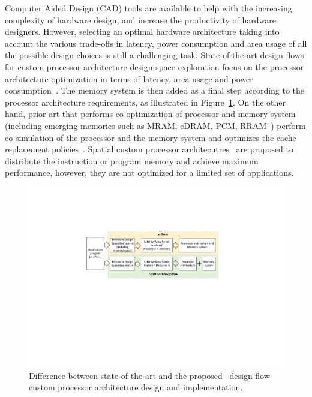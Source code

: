 Computer Aided Design (CAD) tools are available to help with the increasing complexity of hardware design, and increase the productivity of hardware designers. However, selecting an optimal hardware architecture taking into account the various trade-offs in latency, power consumption and area usage of all the possible design choices is still a challenging task. State-of-the-art design flows for custom processor architecture design-space exploration focus on the processor architecture optimization in terms of latency, area usage and power consumption~\cite{Meloni2012,Jordans2014,EusseSAMOS2014,Jozwiak2013,Karuri2009}. The memory system is then added as a final step according to the processor architecture requirements, as illustrated in Figure~\ref{fig:intro}. On the other hand, prior-art that performs co-optimization of processor and memory system (including emerging memories such as MRAM, eDRAM, PCM, RRAM~\cite{mem2016}) perform co-simulation of the processor and the memory system and optimizes the cache replacement policies~\cite{4798259,7092595,6271803,7360193,200116,Patel2016ReducingSL,Komalan:2014,Mittal13f}. Spatial custom processor architecutres~\cite{7284058,8686088} are proposed to distribute the instruction or program memory and achieve maximum performance, however, they are not optimized for a limited set of applications.

\begin{figure}[ht]
    \centering
    \includegraphics[clip, trim=6cm 10.5cm 6.4cm 5.2cm, width=1.0\linewidth]{images/intro_figure.pdf} %
    \caption{Difference between state-of-the-art and the proposed \frameworkname~design flow custom processor architecture design and implementation.}
    \label{fig:intro}
\end{figure}

